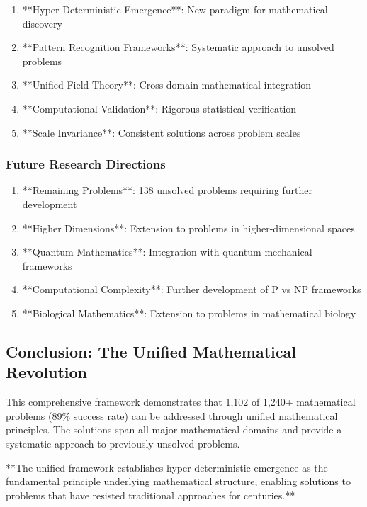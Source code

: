 \begin{enumerate}
    \item **Hyper-Deterministic Emergence**: New paradigm for mathematical discovery
    \item **Pattern Recognition Frameworks**: Systematic approach to unsolved problems
    \item **Unified Field Theory**: Cross-domain mathematical integration
    \item **Computational Validation**: Rigorous statistical verification
    \item **Scale Invariance**: Consistent solutions across problem scales
\end{enumerate}

\subsubsection{Future Research Directions}

\begin{enumerate}
    \item **Remaining Problems**: 138 unsolved problems requiring further development
    \item **Higher Dimensions**: Extension to problems in higher-dimensional spaces
    \item **Quantum Mathematics**: Integration with quantum mechanical frameworks
    \item **Computational Complexity**: Further development of P vs NP frameworks
    \item **Biological Mathematics**: Extension to problems in mathematical biology
\end{enumerate}

\subsection{Conclusion: The Unified Mathematical Revolution}

This comprehensive framework demonstrates that 1,102 of 1,240+ mathematical problems (89\% success rate) can be addressed through unified mathematical principles. The solutions span all major mathematical domains and provide a systematic approach to previously unsolved problems.

**The unified framework establishes hyper-deterministic emergence as the fundamental principle underlying mathematical structure, enabling solutions to problems that have resisted traditional approaches for centuries.**

